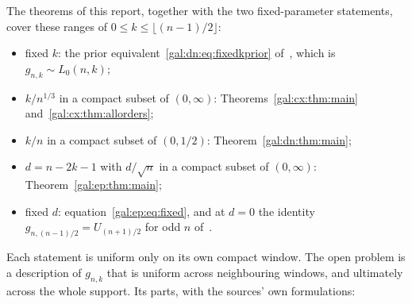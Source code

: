 \documentclass[11pt,letterpaper]{article}
\numberwithin{equation}{section}
\theoremstyle{definition}\newtheorem{definition}[theorem]{Definition}
\theoremstyle{remark}\newtheorem{remark}[theorem]{Remark}
\begin{document}
The theorems of this report, together with the two fixed-parameter statements, cover these ranges of $0\le k\le\lfloor(n-1)/2\rfloor$:
\begin{itemize}
\item fixed $k$: the prior equivalent~\eqref{gal:dn:eq:fixedkprior} of~\cite{comparison}, which is $g_{n,k}\sim L_0(n,k)$;
\item $k/n^{1/3}$ in a compact subset of $(0,\infty)$: Theorems~\ref{gal:cx:thm:main} and~\ref{gal:cx:thm:allorders};
\item $k/n$ in a compact subset of $(0,1/2)$: Theorem~\ref{gal:dn:thm:main};
\item $d=n-2k-1$ with $d/\sqrt n$ in a compact subset of $(0,\infty)$: Theorem~\ref{gal:ep:thm:main};
\item fixed $d$: equation~\eqref{gal:ep:eq:fixed}, and at $d=0$ the identity $g_{n,(n-1)/2}=U_{(n+1)/2}$ for odd $n$ of~\cite[Proposition 9]{comparison}.
\end{itemize}
Each statement is uniform only on its own compact window. The open problem is a description of $g_{n,k}$ that is uniform across neighbouring windows, and ultimately across the whole support. Its parts, with the sources' own formulations:
\end{document}
